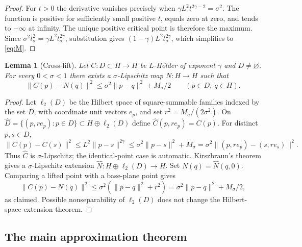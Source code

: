 \documentclass[11pt]{article}
\numberwithin{equation}{section}
\newtheorem{lemma}[theorem]{Lemma}
\theoremstyle{definition}
\theoremstyle{remark}
\newcommand{\norm}[1]{\lVert #1\rVert}
\begin{document}
\begin{proof}
For $t>0$ the derivative vanishes precisely when
$\gamma L^2t^{2\gamma-2}=\sigma^2$. The function is positive for
sufficiently small positive $t$, equals zero at zero, and tends to
$-\infty$ at infinity. The unique positive critical point is therefore
the maximum. Since $\sigma^2t_\sigma^2=\gamma L^2t_\sigma^{2\gamma}$,
substitution gives $(1-\gamma)L^2t_\sigma^{2\gamma}$, which simplifies to
\eqref{eq:M}.
\end{proof}

\begin{lemma}[Cross-lift]\label{lem:crosslift}
Let $C:D\subset H\to H$ be $L$-H\"older of exponent $\gamma$ and
$D\ne\varnothing$. For every $0<\sigma<1$ there exists a
$\sigma$-Lipschitz map $N:H\to H$ such that
\begin{equation}\label{eq:crosslift}
 \norm{C(p)-N(q)}^2
 \le\sigma^2\norm{p-q}^2+M_\sigma/2
 \qquad(p\in D,\ q\in H).
\end{equation}
\end{lemma}

\begin{proof}
Let $\ell_2(D)$ be the Hilbert space of square-summable families indexed
by the set $D$, with coordinate unit vectors $e_p$, and set
$r^2=M_\sigma/(2\sigma^2)$. On
$\widehat D=\{(p,re_p):p\in D\}\subset H\oplus\ell_2(D)$ define
$\widehat C(p,re_p)=C(p)$. For distinct $p,s\in D$,
\[
 \norm{C(p)-C(s)}^2
 \le L^2\norm{p-s}^{2\gamma}
 \le\sigma^2\norm{p-s}^2+M_\sigma
 =\sigma^2\norm{(p,re_p)-(s,re_s)}^2.
\]
Thus $\widehat C$ is $\sigma$-Lipschitz; the identical-point case is
automatic. Kirszbraun's theorem gives a $\sigma$-Lipschitz extension
$\widehat N:H\oplus\ell_2(D)\to H$. Set $N(q)=\widehat N(q,0)$.
Comparing a lifted point with a base-plane point gives
\[
 \norm{C(p)-N(q)}^2
 \le\sigma^2(\norm{p-q}^2+r^2)
 =\sigma^2\norm{p-q}^2+M_\sigma/2,
\]
as claimed. Possible nonseparability of $\ell_2(D)$ does not change the
Hilbert-space extension theorem.
\end{proof}

\subsection{The main approximation theorem}
\end{document}
